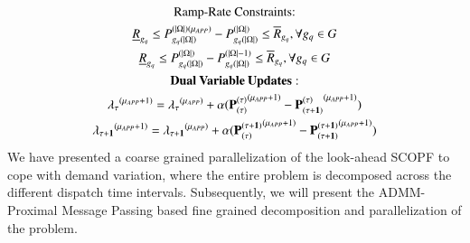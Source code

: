 \documentclass[preprint,12pt,3p]{elsarticle}
\begin{document}
\begin{subequations}
\begin{gather}
\text{Ramp-Rate Constraints:}\notag\\
\underline{R}_{g_q}\leq P_{{g_q}(|\Omega|)}^{(|\Omega|)(\mu_{APP})}-P_{{g_q}(|\Omega|)}^{(|\Omega|)}\leq \overline{R}_{g_q},\forall {g_q}\in G\label{fourth_Look-Ahead_General_Third_Interval_Angle}\\
\underline{R}_{g_q}\leq P_{{g_q}(|\Omega|)}^{(|\Omega|)}-P_{{g_q}(|\Omega|)}^{(|\Omega|-1)}\leq \overline{R}_{g_q},\forall {g_q}\in G\label{fifth_Look-Ahead_General_Third_Interval_Angle}\\
\mathbf{Dual\:Variable \:Updates:}\notag\\
\mathbf{\lambda_{\tau}}^{(\mu_{APP}+1)}=\mathbf{\lambda_{\tau}}^{(\mu_{APP})}+\alpha(\mathbf{P_{({\tau})}^{({\tau})}}^{(\mu_{APP}+1)}-\mathbf{P_{({\tau}+1)}^{({\tau})}}^{(\mu_{APP}+1)})\label{eighth_Look-Ahead_Simple_APP}\\
\mathbf{\lambda_{\tau+1}}^{(\mu_{APP}+1)}=\mathbf{\lambda_{\tau+1}}^{(\mu_{APP})}+\alpha(\mathbf{P_{({\tau})}^{({\tau+1})}}^{(\mu_{APP}+1)}-\mathbf{P_{({\tau+1})}^{({\tau+1})}}^{(\mu_{APP}+1)})\label{ninth_Look-Ahead_Simple_APP}
\end{gather}
\end{subequations}
We have presented a coarse grained parallelization of the look-ahead SCOPF to cope with demand variation, where the entire problem is decomposed across the different dispatch time intervals. Subsequently, we will present the ADMM-Proximal Message Passing based fine grained decomposition and parallelization of the problem.
\end{document}
